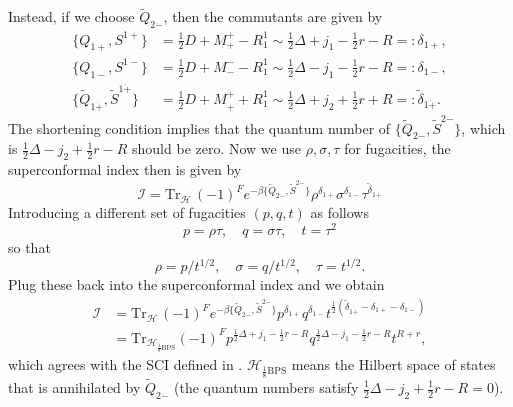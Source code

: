 \documentclass[a4paper,11pt]{article}
\begin{document}
Instead, if we choose $\widetilde{Q}_{2\dot{-}}$, then the commutants are given by
\begin{equation}
\begin{aligned}
    \{Q_{1+}, S^{1+}\} &= \frac{1}{2}D + M_+^+ - R^1_1 \sim \frac{1}{2} \Delta + j_1-\frac{1}{2}r-R =: \delta_{1+}, \\ 
    \{Q_{1-}, S^{1-}\} &= \frac{1}{2}D + M_-^- - R^1_1 \sim \frac{1}{2}\Delta - j_1 - \frac{1}{2}r-R =: \delta_{1-},\\
    \{\widetilde{Q}_{1\dot{+}}, \widetilde{S}^{1\dot{+}}\} &= \frac{1}{2} D + M_{\dot{+}}^{\dot{+}} + R^1_1 \sim \frac{1}{2} \Delta + j_2 +\frac{1}{2} r + R =: \tilde{\delta}_{1\dot{+}}.
\end{aligned}
\end{equation}
The shortening condition implies that the quantum number of $\{\widetilde{Q}_{2\dot{-}}, \widetilde{S}^{2\dot{-}}\}$, which is $\frac{1}{2}\Delta - j_2 +\frac{1}{2}r - R$ should be zero. Now we use $\rho, \sigma, \tau$ for fugacities, the superconformal index then is given by
\begin{equation}
    \mathcal{I} = \mathrm{Tr}_\mathcal{H}\, (-1)^F e^{-\beta \{\widetilde{Q}_{2\dot{-}}, \widetilde{S}^{2\dot{-}}\}} \rho^{\delta_{1+}} \sigma^{\delta_{1-}} \tau^{\tilde{\delta}_{1\dot{+}}}
\end{equation}
Introducing a different set of fugacities $(p,q,t)$ as follows
\begin{equation}
    p = \rho \tau, \quad q = \sigma \tau, \quad t = \tau^2
\end{equation}
so that
\begin{equation}
    \rho = p / t^{1/2}, \quad \sigma = q/t^{1/2}, \quad \tau = t^{1/2}.
\end{equation}
Plug these back into the superconformal index and we obtain
\begin{equation}
\begin{aligned}
    \mathcal{I} &= \mathrm{Tr}_\mathcal{H}\, (-1)^F e^{-\beta \{\widetilde{Q}_{2\dot{-}}, \widetilde{S}^{2\dot{-}}\}} p^{\delta_{1+}} q^{\delta_{1-}} t^{\frac{1}{2}(\tilde{\delta}_{1\dot{+}} - \delta_{1+} - \delta_{1-} )}\\
    &= \mathrm{Tr}_{\mathcal{H}_{\frac{1}{8}\mathrm{BPS}}} (-1)^F p^{\frac{1}{2}\Delta + j_1 - \frac{1}{2}r -R} q^{\frac{1}{2}\Delta - j_1 - \frac{1}{2}r -R} t^{R+r},
\end{aligned}
\end{equation}
which agrees with the SCI defined in \cite{Beem:2013sza}. $\mathcal{H}_{\frac{1}{8}\mathrm{BPS}}$ means the Hilbert space of states that is annihilated by $\widetilde{Q}_{2\dot{-}}$ (the quantum numbers satisfy $\frac{1}{2}\Delta - j_2 + \frac{1}{2}r -R = 0$).
\end{document}
